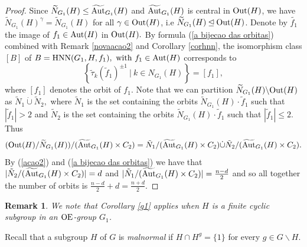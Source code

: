 \documentclass[a4paper,12pt]{article}
\newtheorem{cor}[thm]{Corollary}
\def\OE{{\rm OE}}
\def\aut {{\rm Aut}}
\def\out {{\rm Out}}
\def\hnn {{\rm HNN}}
\newtheorem{rem}[thm]{Remark}
\begin{document}
{\begin{proof} Since $\widetilde{N}_{G_1}(H)\leq \widetilde{\aut}_{G_1}(H)$ and $\widetilde{\aut}_{G_1}(H)$ is central in $\out(H)$, we have $\widetilde{N}_{G_1}(H)^{\gamma}=\widetilde{N}_{G_1}(H)$ for all $\gamma \in \out(H)$, i.e $\widetilde{N}_{G_1}(H)\unlhd \out(H)$.   Denote by $\tilde{f_1}$ the image of $f_1 \in \aut(H)$ in $\out(H).$ 
By formula (\ref{a bijecao das orbitas}) combined with Remark \ref{novaacao2} and Corollary \ref{corhnn}, the isomorphism class $[B]$ of $B=\hnn(G_1, H, f_1), \mbox{ with } f_1\in \aut(H)$ corresponds to $$\left\{ \tilde{\tau}_{k}  \left(\tilde{f}_1\right)^{\pm 1} \ | \ k
\in  N_{G_1}(H) \right\}=[f_1],$$ where $[f_1]$ denotes the orbit of $f_1.$ Note that we can partition $\widetilde{N}_{G_1}(H) \backslash \out(H)$ as $\tilde{N}_{1} \dot\cup %
\tilde{N}_{2},$ where $\tilde{N}_{1}$ is the set containing the orbits $\widetilde{N}_{G_1}(H) \cdot \tilde{f}_1$ such that $|\tilde{f}_1|> 2$ and $\tilde{N}_{2}$ is the set containing the orbits $\widetilde{N}_{G_1}(H) \cdot \tilde{f}_1$ such that $|\tilde{f}_1| \leq 2.$ Thus $$ (\out(H)/\widetilde{N}_{G_1}(H)) /  ( \widetilde{\aut}_{G_1}(H) \times C_2) =  \tilde{N}_1 /  ( \widetilde{\aut}_{G_1}(H) \times C_2) \dot \cup \tilde{N}_2 /  ( \widetilde{\aut}_{G_1}(H) \times C_2).$$ By (\ref{acao2}) and (\ref{a bijecao das orbitas}) we have that $|\tilde{N}_2 / ( \widetilde{\aut}_{G_1}(H) \times C_2)|=d$ and $|\tilde{N}_{1} / ( \widetilde{\aut}_{G_1}(H) \times C_2)|= \frac{n - d}{2}$ and so all together the number of orbits is $\frac{n - d}{2}+d=\frac{n + d}{2}$. 
\end{proof}




\begin{rem}
We note that Corollary \ref{g1} applies when $H$ is a finite cyclic subgroup in an $\OE$-group $G_1$. 
\end{rem}

Recall that a subgroup $H$ of $G$ is {\it malnormal} if $H\cap H^g=\{1\}$ for every $g \in G \backslash H$.


}
\end{document}
